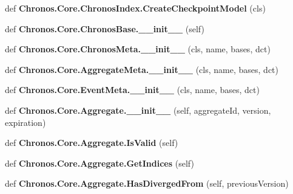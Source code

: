 \begin{DoxyCompactItemize}
\item 
def {\bfseries Chronos.\+Core.\+Chronos\+Index.\+Create\+Checkpoint\+Model} (cls)\hypertarget{group__Chronos_gae9710dba2dcd58e352ee325022a87bb6}{}\label{group__Chronos_gae9710dba2dcd58e352ee325022a87bb6}

\item 
def {\bfseries Chronos.\+Core.\+Chronos\+Base.\+\_\+\+\_\+init\+\_\+\+\_\+} (self)\hypertarget{group__Chronos_gac65559561185670a73f9c37a04777820}{}\label{group__Chronos_gac65559561185670a73f9c37a04777820}

\item 
def {\bfseries Chronos.\+Core.\+Chronos\+Meta.\+\_\+\+\_\+init\+\_\+\+\_\+} (cls, name, bases, dct)\hypertarget{group__Chronos_gab7b2650ab12c2036e4bc52f4385d3397}{}\label{group__Chronos_gab7b2650ab12c2036e4bc52f4385d3397}

\item 
def {\bfseries Chronos.\+Core.\+Aggregate\+Meta.\+\_\+\+\_\+init\+\_\+\+\_\+} (cls, name, bases, dct)\hypertarget{group__Chronos_ga013862cabe9a036bc05737d526a9d4d6}{}\label{group__Chronos_ga013862cabe9a036bc05737d526a9d4d6}

\item 
def {\bfseries Chronos.\+Core.\+Event\+Meta.\+\_\+\+\_\+init\+\_\+\+\_\+} (cls, name, bases, dct)\hypertarget{group__Chronos_ga69b496590dfe2edb6772896008009646}{}\label{group__Chronos_ga69b496590dfe2edb6772896008009646}

\item 
def {\bfseries Chronos.\+Core.\+Aggregate.\+\_\+\+\_\+init\+\_\+\+\_\+} (self, aggregate\+Id, version, expiration)\hypertarget{group__Chronos_gacafc5f85f185409ae52c714c99ebdeb9}{}\label{group__Chronos_gacafc5f85f185409ae52c714c99ebdeb9}

\item 
def {\bfseries Chronos.\+Core.\+Aggregate.\+Is\+Valid} (self)\hypertarget{group__Chronos_gabe919a83ddf8d07482f16aa29c6a1a9f}{}\label{group__Chronos_gabe919a83ddf8d07482f16aa29c6a1a9f}

\item 
def {\bfseries Chronos.\+Core.\+Aggregate.\+Get\+Indices} (self)\hypertarget{group__Chronos_gac9119d2b55ae83e58e70adb4eee2fa47}{}\label{group__Chronos_gac9119d2b55ae83e58e70adb4eee2fa47}

\item 
def {\bfseries Chronos.\+Core.\+Aggregate.\+Has\+Diverged\+From} (self, previous\+Version)\hypertarget{group__Chronos_ga1d683718ea6dd56a8fce6d7757b8cdfd}{}\label{group__Chronos_ga1d683718ea6dd56a8fce6d7757b8cdfd}


\end{DoxyCompactItemize}
